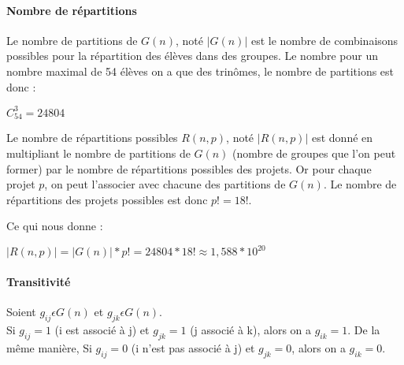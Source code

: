 \documentclass[10pt,a4paper]{scrartcl}
\begin{document}
\paragraph{Nombre de répartitions}
Le nombre de partitions de $G(n)$, noté $|G(n)|$ est le nombre de combinaisons possibles pour la répartition des élèves dans des groupes.
Le nombre pour un nombre maximal de 54 élèves on a que des trinômes, le nombre de partitions est donc :
\begin{center}
	$C_{54}^3 = 24804$
\end{center}

Le nombre de répartitions possibles $R(n,p)$, noté $|R(n,p)|$ est donné en multipliant le nombre de partitions de $G(n)$ (nombre de groupes que l'on peut former) par le nombre de répartitions possibles des projets. Or pour chaque projet $p$, on peut l'associer avec chacune des partitions de $G(n)$.
Le nombre de répartitions des projets possibles est donc $p! = 18!$.

Ce qui nous donne :
\begin{center}
	$|R(n,p)| = |G(n)| * p! = 24804 * 18! \approx 1,588*10^{20}$
\end{center}

\paragraph{Transitivité}
Soient $g_{ij}\epsilon G(n)$ et $g_{jk}\epsilon G(n)$. \\
Si $g_{ij} = 1$ (i est associé à j) et $g_{jk} = 1$ (j associé à k), alors on a $g_{ik} = 1$.
De la même manière, Si $g_{ij} = 0$ (i n'est pas associé à j) et $g_{jk} = 0$, alors on a $g_{ik} = 0$.
\end{document}
